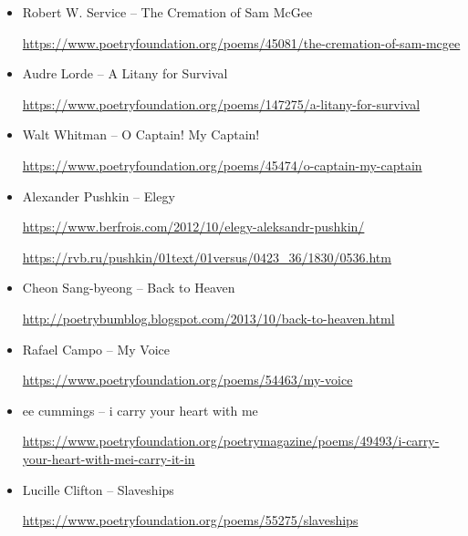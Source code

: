 \documentclass[12pt, openany, letterpaper]{memoir}
\begin{document}
\begin{itemize}
	\item Robert W. Service -- The Cremation of Sam McGee
	
	\hyperref[https://www.poetryfoundation.org/poems/45081/the-cremation-of-sam-mcgee]{https://www.poetryfoundation.org/poems/45081/the-cremation-of-sam-mcgee}
	
	\item Audre Lorde -- A Litany for Survival
	
	\hyperref[https://www.poetryfoundation.org/poems/147275/a-litany-for-survival]{https://www.poetryfoundation.org/poems/147275/a-litany-for-survival}
	
	\item Walt Whitman -- O Captain! My Captain!
	
	\hyperref[https://www.poetryfoundation.org/poems/45474/o-captain-my-captain]{https://www.poetryfoundation.org/poems/45474/o-captain-my-captain}
	
	\item Alexander Pushkin -- Elegy
	
	\hyperref[https://www.berfrois.com/2012/10/elegy-aleksandr-pushkin/]{https://www.berfrois.com/2012/10/elegy-aleksandr-pushkin/}
	
	\hyperref[https://rvb.ru/pushkin/01text/01versus/0423_36/1830/0536.htm]{https://rvb.ru/pushkin/01text/01versus/0423\_36/1830/0536.htm}
	
	\item  Cheon Sang-byeong -- Back to Heaven
	
	\hyperref[http://poetrybumblog.blogspot.com/2013/10/back-to-heaven.html]{http://poetrybumblog.blogspot.com/2013/10/back-to-heaven.html}
	
	\item Rafael Campo -- My Voice
	
	\hyperref[https://www.poetryfoundation.org/poems/54463/my-voice]{https://www.poetryfoundation.org/poems/54463/my-voice}
	
	\item ee cummings -- i carry your heart with me
	
	\hyperref[https://www.poetryfoundation.org/poetrymagazine/poems/49493/i-carry-your-heart-with-mei-carry-it-in]{https://www.poetryfoundation.org/poetrymagazine/poems/49493/i-carry-your-heart-with-mei-carry-it-in}
	
	\item Lucille Clifton -- Slaveships
	
	\hyperref[https://www.poetryfoundation.org/poems/55275/slaveships]{https://www.poetryfoundation.org/poems/55275/slaveships}
	

\end{itemize}
\end{document}
